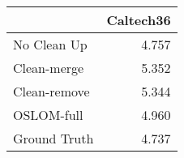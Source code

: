 \begin{tabular}{lr}
\toprule
{} & Caltech36 \\
\midrule
No Clean Up  &     4.757 \\
Clean-merge  &     5.352 \\
Clean-remove &     5.344 \\
OSLOM-full   &     4.960 \\
Ground Truth &     4.737 \\
\bottomrule
\end{tabular}
